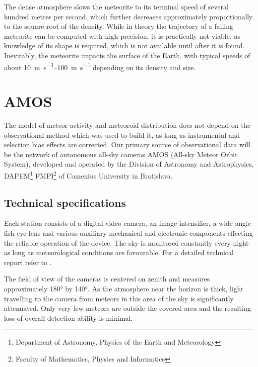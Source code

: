         The dense atmosphere slows the meteorite to its terminal speed of several hundred metres per second,
        which further decreases approximately proportionally to the square root of the density.
        While in theory the trajectory of a falling meteorite can be computed with high precision,
        it is practically not viable, as knowledge of its shape is required, which is not available
        until after it is found.
        Inevitably, the meteorite impacts the surface of the Earth,
        with typical speeds of about \SIrange{10}{100}{\metre\per\second} depending on its density and size.

\section{AMOS} \label{iA}
    The model of meteor activity and meteoroid distribution does not depend on the observational method
    which was used to build it, as long as instrumental and selection bias effects are corrected.
    Our primary source of observational data will be the network of autonomous all-sky cameras AMOS (All-sky Meteor Orbit System),
    developed and operated by the Division of Astronomy and Astrophysics,
    DAPEM\footnote{Department of Astronomy, Physics of the Earth and Meteorology}
    FMPI\footnote{Faculty of Mathematics, Physics and Informatics} of Comenius University in Bratislava.

    \subsection{Technical specifications} \label{iAt}
        Each station consists of a digital video camera, an image intensifier, a wide angle fish-eye lens
        and various auxiliary mechanical and electronic components effecting
        the reliable operation of the device. The sky is monitored constantly every night
        as long as meteorological conditions are favourable. For a detailed technical report refer to \citet{zigo+2013,toth+2015}.

        The field of view of the cameras is centered on zenith and measures approximately \ang{180} by \ang{140}.
        As the atmosphere near the horizon is thick, light travelling to the camera from meteors
        in this area of the sky is significantly attenuated.
        Only very few meteors are outside the covered area and the resulting loss of overall detection ability is minimal.


